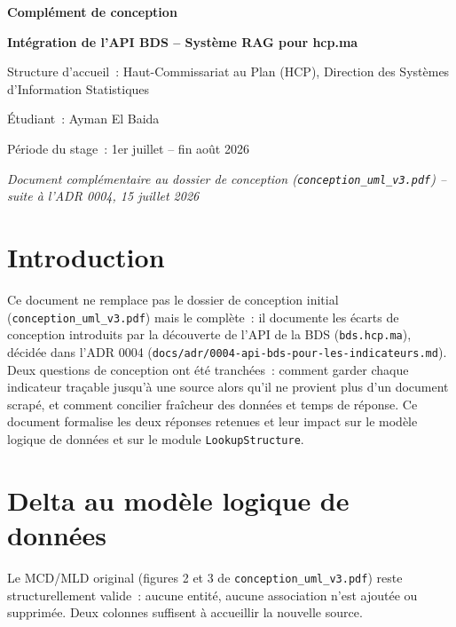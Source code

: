 \documentclass[11pt,a4paper]{article}
\begin{document}
\begin{titlepage}
\centering
\vspace*{2cm}
{\Huge\bfseries\color{navy} Compl\'ement de conception\par}
\vspace{0.5cm}
{\Large\bfseries\color{gold} Int\'egration de l'API BDS -- Syst\`eme RAG pour hcp.ma\par}
\vspace{1.5cm}
{\large\color{greytext} Structure d'accueil~: Haut-Commissariat au Plan (HCP), Direction des Syst\`emes d'Information Statistiques\par}
\vspace{0.3cm}
{\large\color{greytext} \'Etudiant~: Ayman El Baida\par}
\vspace{0.3cm}
{\large\color{greytext} P\'eriode du stage~: 1er juillet -- fin ao\^ut 2026\par}
\vspace{0.3cm}
{\large\itshape\color{greytext} Document compl\'ementaire au dossier de conception (\texttt{conception\_uml\_v3.pdf}) -- suite \`a l'ADR 0004, 15 juillet 2026\par}
\vfill
\end{titlepage}

\tableofcontents
\newpage

\section{Introduction}
Ce document ne remplace pas le dossier de conception initial (\texttt{conception\_uml\_v3.pdf}) mais le compl\`ete~: il documente les \'ecarts de conception introduits par la d\'ecouverte de l'API de la BDS (\texttt{bds.hcp.ma}), d\'ecid\'ee dans l'ADR 0004 (\texttt{docs/adr/0004-api-bds-pour-les-indicateurs.md}). Deux questions de conception ont \'et\'e tranch\'ees~: comment garder chaque indicateur tra\c{c}able jusqu'\`a une source alors qu'il ne provient plus d'un document scrap\'e, et comment concilier fra\^icheur des donn\'ees et temps de r\'eponse. Ce document formalise les deux r\'eponses retenues et leur impact sur le mod\`ele logique de donn\'ees et sur le module \texttt{LookupStructure}.

\section{Delta au mod\`ele logique de donn\'ees}
Le MCD/MLD original (figures 2 et 3 de \texttt{conception\_uml\_v3.pdf}) reste structurellement valide~: aucune entit\'e, aucune association n'est ajout\'ee ou supprim\'ee. Deux colonnes suffisent \`a accueillir la nouvelle source.
\end{document}
